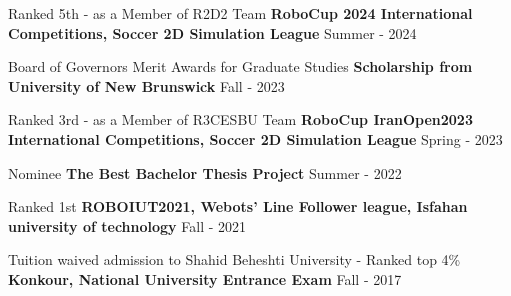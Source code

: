 \begin{cventries}
    
    \cventry
    {Ranked 5th - as a Member of R2D2 Team}
    {\textbf {RoboCup 2024 International Competitions, Soccer 2D Simulation League}}
    {}
    {Summer - 2024}
    {}
    \vspace{0.35 cm}
    
    
    \cventry
    {Board of Governors Merit Awards for Graduate Studies}
    {\textbf {Scholarship from University of New Brunswick}}
    {}
    {Fall - 2023}
    {}
    \vspace{0.35 cm}


    \cventry
    {Ranked 3rd - as a Member of R3CESBU Team}
    {\textbf {RoboCup IranOpen2023 International Competitions, Soccer 2D Simulation League}}
    {}
    {Spring - 2023}
    {}
    \vspace{0.35 cm}

    
    \cventry
    {Nominee}
    {\textbf {The Best Bachelor Thesis Project}}
    {}
    {Summer - 2022}
    {}
    \vspace{0.35 cm}

    
    \cventry
    {Ranked 1st}
    {\textbf {ROBOIUT2021, Webots’ Line Follower league, Isfahan university of technology}}
    {}
    {Fall - 2021}
    {}
    \vspace{0.35 cm}




    \cventry
    {Tuition waived admission to Shahid Beheshti University - Ranked top 4\%}
    {\textbf {Konkour, National University Entrance Exam}}
    {}
    {Fall - 2017}
    {}
\end{cventries}